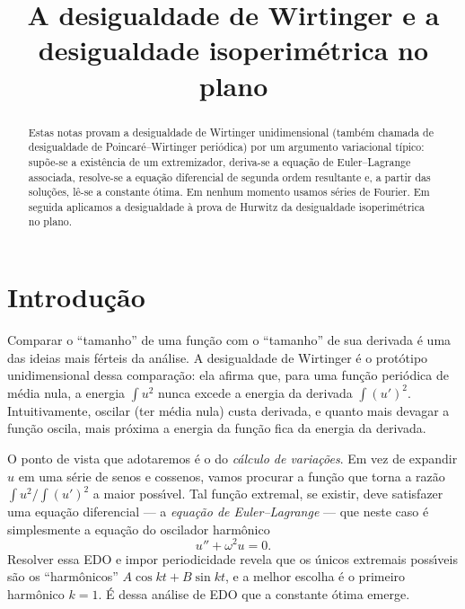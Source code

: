 \documentclass[11pt,a4paper]{amsart}
\title[A desigualdade de Wirtinger]{A desigualdade de Wirtinger e a desigualdade
isoperim\'etrica no plano}
\author{}
\date{}
\theoremstyle{plain}
\theoremstyle{definition}
\theoremstyle{remark}
\begin{document}
\begin{abstract}
Estas notas provam a desigualdade de Wirtinger unidimensional (tamb\'em chamada
de desigualdade de Poincar\'e--Wirtinger peri\'odica) por um argumento
variacional t\'ipico:
sup\~oe-se a exist\^encia de um extremizador, deriva-se a equa\c{c}\~ao de
Euler--Lagrange associada, resolve-se a equa\c{c}\~ao diferencial de segunda
ordem resultante e, a partir das solu\c{c}\~oes, l\^e-se a constante \'otima.
Em nenhum momento usamos s\'eries de Fourier. Em seguida aplicamos a
desigualdade \`a prova de Hurwitz da desigualdade isoperim\'etrica no plano.
\end{abstract}

\maketitle


\vspace{3mm}

\section{Introdu\c{c}\~ao}

Comparar o ``tamanho'' de uma fun\c{c}\~ao com o ``tamanho'' de sua derivada
\'e uma das ideias mais f\'erteis da an\'alise. A desigualdade de Wirtinger \'e
o prot\'otipo unidimensional dessa compara\c{c}\~ao: ela afirma que, para uma
fun\c{c}\~ao peri\'odica de m\'edia nula, a energia $\int u^2$ nunca excede a
energia da derivada $\int (u')^2$. Intuitivamente, oscilar (ter m\'edia nula)
custa derivada, e quanto mais devagar a fun\c{c}\~ao oscila, mais pr\'oxima a
energia da fun\c{c}\~ao fica da energia da derivada.

O ponto de vista que adotaremos \'e o do \emph{c\'alculo de varia\c{c}\~oes}.
Em vez de expandir $u$ em uma s\'erie de senos e cossenos, vamos procurar a
fun\c{c}\~ao que torna a raz\~ao $\int u^2 / \int (u')^2$ a maior poss\'\i vel.
Tal fun\c{c}\~ao extremal, se existir, deve satisfazer uma equa\c{c}\~ao
diferencial --- a \emph{equa\c{c}\~ao de Euler--Lagrange} --- que neste caso \'e
simplesmente a equa\c{c}\~ao do oscilador harm\^onico
\[
  u'' + \omega^2 u = 0 .
\]
Resolver essa EDO e impor periodicidade revela que os \'unicos extremais
poss\'\i veis s\~ao os ``harm\^onicos'' $A\cos kt + B\sin kt$, e a melhor
escolha \'e o primeiro harm\^onico $k=1$. \'E dessa an\'alise de EDO que a
constante \'otima emerge.
\end{document}
